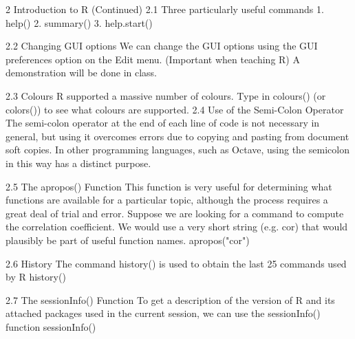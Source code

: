 \documentclass{beamer}
\begin{document}
	\begin{frame}
				2 Introduction to R (Continued)
		2.1 Three particularly useful commands
		1. help()
		2. summary()
		3. help.start()
		
	\end{frame}
	\begin{frame}
		
		2.2 Changing GUI options
		We can change the GUI options using the GUI preferences option on the Edit menu. (Important
		when teaching R) A demonstration will be done in class.
	\end{frame}
	\begin{frame}
		
		2.3 Colours
		R supported a massive number of colours. Type in colours() (or colors()) to see what colours
		are supported.
		2.4 Use of the Semi-Colon Operator
		The semi-colon operator at the end of each line of code is not necessary in general, but using it
		overcomes errors due to copying and pasting from document soft copies. In other programming
		languages, such as Octave, using the semicolon in this way has a distinct purpose.
	\end{frame}
	\begin{frame}
		2.5 The apropos() Function
		This function is very useful for determining what functions are available for a particular topic,
		although the process requires a great deal of trial and error. Suppose we are looking for a
		command to compute the correlation coefficient. We would use a very short string (e.g. cor)
		that would plausibly be part of useful function names.
		apropos("cor")
	\end{frame}
	\begin{frame}
		
		2.6 History
		The command history() is used to obtain the last 25 commands used by R
		history()

\end{frame}
\begin{frame}
	
		2.7 The sessionInfo() Function
		To get a description of the version of R and its attached packages used in the current session,
		we can use the sessionInfo() function
		sessionInfo()
	\end{frame}
\end{document}
